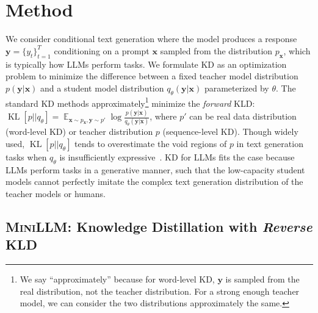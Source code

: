 \documentclass{article}
\def\expct{\mathop{\mathbb{E}}}
\def\forkl{\operatorname{KL}[p||q_\theta]}
\def\bx{\bm{x}}
\def\by{\bm{y}}
\begin{document}
\section{Method}
\label{sec:method}
\vspace{-0.1cm}
We consider conditional text generation where the model produces a response $\by=\{y_t\}_{t=1}^T$ conditioning on a prompt $\bx$ sampled from the distribution $p_{\bm{x}}$, which is typically how LLMs perform tasks. We formulate KD as an optimization problem to minimize the difference between a fixed teacher model distribution $p(\by|\bx)$ and a student model distribution $q_\theta(\by|\bx)$ parameterized by $\theta$. The standard KD methods approximately\footnote{We say ``approximately'' because for word-level KD, $\by$ is sampled from the real distribution, not the teacher distribution. For a strong enough teacher model, we can consider the two distributions approximately the same.} minimize the \textit{forward} KLD: $\forkl = \expct_{\bx \sim p_{\bx}, \by \sim p'} \log \frac{p(\by|\bx)}{q_\theta (\by|\bx)}$, where $p'$ can be real data distribution (word-level KD) or teacher distribution $p$ (sequence-level KD). Though widely used, $\forkl$ tends to overestimate the void regions of $p$ in text generation tasks when $q_\theta$ is insufficiently expressive~\citep{tailor}. KD for LLMs fits the case because LLMs perform tasks in a generative manner, such that the low-capacity student models cannot perfectly imitate the complex text generation distribution of the teacher models or humans.


\subsection{\textsc{MiniLLM}: Knowledge Distillation with \textit{Reverse} KLD}
\label{sec:minillm}
\end{document}
